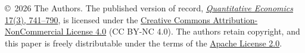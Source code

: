 \documentclass[\latexroot/\projectname]{subfiles}
\begin{document}
\vspace{0.3\baselineskip}
\begin{minipage}{\textwidth}
  \footnotesize \copyright{}~2026 The Authors. The published version of record,
  \href{https://doi.org/10.3982/QE2442}{\textit{Quantitative Economics} 17(3), 741--790},
  is licensed under the \href{https://creativecommons.org/licenses/by-nc/4.0/}{Creative
  Commons Attribution-NonCommercial License 4.0} (CC BY-NC 4.0). The authors retain
  copyright, and this paper is freely distributable under the terms of the
  \href{https://www.apache.org/licenses/LICENSE-2.0}{Apache License 2.0}.
\end{minipage}

%



\titlepagefinish

\smartbib
\end{document}
